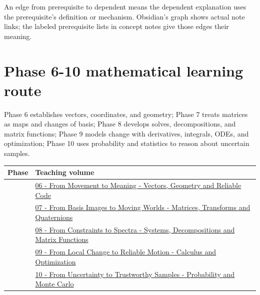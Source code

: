 An edge from prerequisite to dependent means the dependent explanation uses the prerequisite's definition or mechanism. Obsidian's graph shows actual note links; the labeled prerequisite lists in concept notes give those edges their meaning.

\section{Phase 6-10 mathematical learning route}\label{appendix-4ad47bdd269a-phase-6-10-mathematical-learning-route}

Phase 6 establishes vectors, coordinates, and geometry; Phase 7 treats matrices as maps and changes of basis; Phase 8 develops solves, decompositions, and matrix functions; Phase 9 models change with derivatives, integrals, ODEs, and optimization; Phase 10 uses probability and statistics to reason about uncertain samples.

{\def\LTcaptype{none} %
\begin{longtable}[]{@{}
  >{\raggedright\arraybackslash}p{}
  >{\raggedright\arraybackslash}p{}@{}}
\toprule\noalign{}
\begin{minipage}[b]{\linewidth}\raggedright
Phase
\end{minipage} & \begin{minipage}[b]{\linewidth}\raggedright
Teaching volume
\end{minipage} \\
\midrule\noalign{}
\endhead
\bottomrule\noalign{}
\endlastfoot
6 & \href{Continuous\%20Notes/Computing\%20Foundations\%20-\%20From\%20Bits\%20to\%20C++\%20and\%20Systems\%20APIs\#The\%20panel\%20gives\%20us\%20a\%20reason\%20to\%20learn/}{06 - From Movement to Meaning - Vectors, Geometry and Reliable Code} \\
7 & \href{Continuous\%20Notes/Computing\%20Foundations\%20-\%20From\%20Bits\%20to\%20C++\%20and\%20Systems\%20APIs\#Keep\%20the\%20promises\%20visible\%20while\%20moving\%20between\%20representations/}{07 - From Basis Images to Moving Worlds - Matrices, Transforms and Quaternions} \\
8 & \href{Continuous\%20Notes/Computing\%20Foundations\%20-\%20From\%20Bits\%20to\%20C++\%20and\%20Systems\%20APIs\#The\%20graphics\%20problem\%20hiding\%20inside\%20a\%20matrix\%20equation/}{08 - From Constraints to Spectra - Systems, Decompositions and Matrix Functions} \\
9 & \href{Continuous\%20Notes/Computing\%20Foundations\%20-\%20From\%20Bits\%20to\%20C++\%20and\%20Systems\%20APIs\#Functions,\%20limits,\%20continuity,\%20and\%20scalar\%20change/}{09 - From Local Change to Reliable Motion - Calculus and Optimization} \\
10 & \href{Continuous\%20Notes/Computing\%20Foundations\%20-\%20From\%20Bits\%20to\%20C++\%20and\%20Systems\%20APIs\#Learning\%20route/}{10 - From Uncertainty to Trustworthy Samples - Probability and Monte Carlo} \\
\end{longtable}
}


